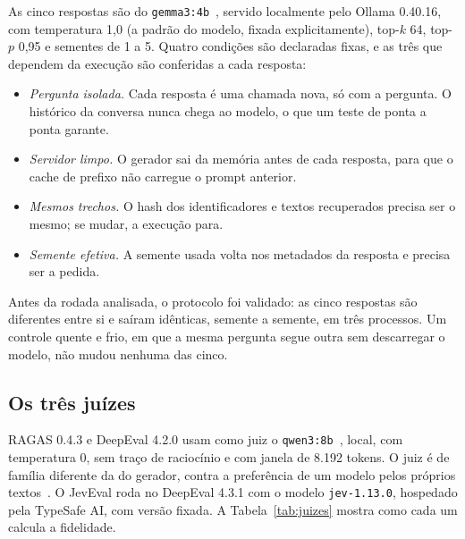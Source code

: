 \documentclass[12pt]{article}
\newcommand{\code}[1]{\texttt{\small #1}}
\begin{document}
As cinco respostas são do \code{gemma3:4b}~\cite{gemma2025report}, servido
localmente pelo Ollama 0.40.16, com temperatura 1,0 (a padrão do modelo, fixada
explicitamente), top-$k$ 64, top-$p$ 0,95 e sementes de 1 a 5. Quatro condições
são declaradas fixas, e as três que dependem da execução são conferidas a cada
resposta:

\begin{itemize}
\item \emph{Pergunta isolada.} Cada resposta é uma chamada nova, só com a
pergunta. O histórico da conversa nunca chega ao modelo, o que um teste de ponta a
ponta garante.
\item \emph{Servidor limpo.} O gerador sai da memória antes de cada resposta, para
que o cache de prefixo não carregue o prompt anterior.
\item \emph{Mesmos trechos.} O hash dos identificadores e textos recuperados
precisa ser o mesmo; se mudar, a execução para.
\item \emph{Semente efetiva.} A semente usada volta nos metadados da resposta e
precisa ser a pedida.
\end{itemize}

Antes da rodada analisada, o protocolo foi validado: as cinco respostas são
diferentes entre si e saíram idênticas, semente a semente, em três processos. Um
controle quente e frio, em que a mesma pergunta segue outra sem descarregar o
modelo, não mudou nenhuma das cinco.

\subsection{Os três juízes}
\label{sec:juizes}

RAGAS 0.4.3 e DeepEval 4.2.0 usam como juiz o
\code{qwen3:8b}~\cite{qwen2025report}, local, com temperatura 0, sem traço de
raciocínio e com janela de 8.192 tokens. O juiz é de família diferente da do
gerador, contra a preferência de um modelo pelos próprios
textos~\cite{panickssery2024llm}. O JevEval roda no DeepEval 4.3.1 com o modelo
\code{jev-1.13.0}, hospedado pela TypeSafe AI, com versão fixada. A
Tabela~\ref{tab:juizes} mostra como cada um calcula a fidelidade.
\end{document}
